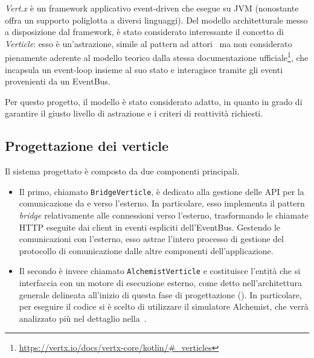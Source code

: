       \emph{Vert.x} è un framework applicativo event-driven che esegue su JVM (nonostante offra un supporto poliglotta a diversi linguaggi).
      Del modello architetturale messo a disposizione dal framework, è stato considerato interessante il concetto di \emph{Verticle}:
      esso è un'astrazione, simile al pattern ad attori~\cite{DBLP:conf/ijcai/HewittBS73} ma non considerato pienamente aderente al modello teorico dalla stessa documentazione ufficiale\footnote{\url{https://vertx.io/docs/vertx-core/kotlin/\#_verticles}},
      che incapsula un event-loop insieme al suo stato e interagisce tramite gli eventi provenienti da un EventBus.

      Per questo progetto, il modello è stato considerato adatto, in quanto in grado di garantire il giusto livello di astrazione e i criteri di reattività richiesti.

    \subsection{Progettazione dei verticle}
      Il sistema progettato è composto da due componenti principali.

      \begin{itemize}
        \item
          Il primo, chiamato \texttt{BridgeVerticle}, è dedicato alla gestione delle API per la comunicazione da e verso l'esterno.
          In particolare, esso implementa il pattern \emph{bridge} relativamente alle connessioni verso l'esterno, trasformando le chiamate HTTP eseguite dai client in eventi espliciti dell'EventBus.
          Gestendo le comunicazioni con l'esterno, esso astrae l'intero processo di gestione del protocollo di comunicazione dalle altre componenti dell'applicazione.
        \item
          Il secondo è invece chiamato \texttt{AlchemistVerticle} e costituisce l'entità che si interfaccia con un motore di esecuzione esterno,
          come detto nell'architettura generale delineata all'inizio di questa fase di progettazione ().
          In particolare, per eseguire il codice si è scelto di utilizzare il simulatore Alchemist, che verrà analizzato più nel dettaglio nella~.
      \end{itemize}

